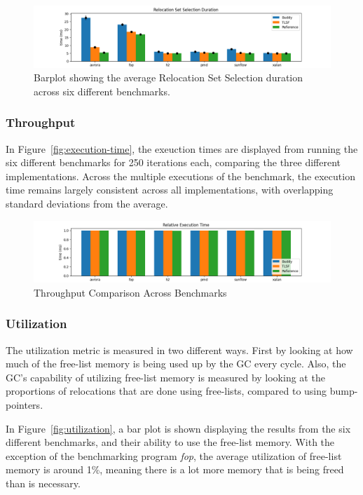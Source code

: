 \begin{figure}[H]
\centering
\includegraphics[width=1\textwidth]{figures/set_selection.png}
\caption{Barplot showing the average Relocation Set Selection duration across six different benchmarks.}
\label{fig:set-selection}
\end{figure}


\subsubsection{Throughput}
In Figure~\ref{fig:execution-time}, the exeuction times are displayed from running the six different benchmarks for 250 iterations each, comparing the three different implementations.
Across the multiple executions of the benchmark, the execution time remains largely consistent across all implementations, with overlapping standard deviations from the average. 

\begin{figure}[H]
  \centering
\includegraphics[width=1\textwidth]{figures/execution_time.png}
\caption{Throughput Comparison Across Benchmarks}
\label{fig:exeuction-time}
\end{figure}

\subsubsection{Utilization}
The utilization metric is measured in two different ways. First by looking at how much of the free-list memory is being used up by the GC every cycle. Also, the GC's capability of utilizing free-list memory is measured by looking at the proportions of relocations that are done using free-lists, compared to using bump-pointers.

In Figure~\ref{fig:utilization}, a bar plot is shown displaying the results from the six different benchmarks, and their ability to use the free-list memory. With the exception of the benchmarking program \textit{fop}, the average utilization of free-list memory is around 1\%, meaning there is a lot more memory that is being freed than is necessary.

